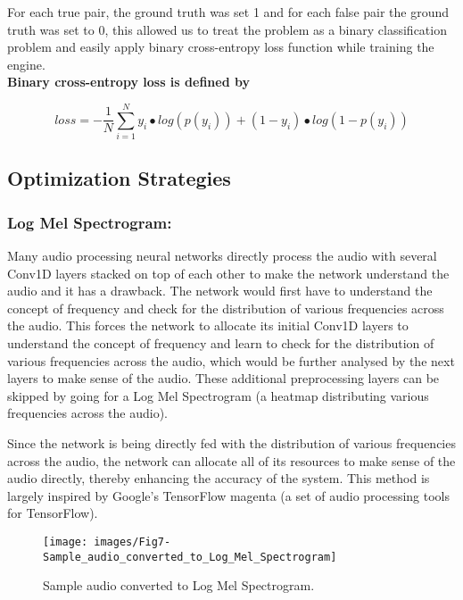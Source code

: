 \documentclass[10pt,twocolumn]{article}
\begin{document}
For each true pair, the ground truth was set 1 and for each false pair the ground truth was set to 0, this allowed us to treat the problem as a binary classification problem and easily apply binary cross-entropy loss function while training the engine.
\\


\textbf{Binary cross-entropy loss is defined by}

\[loss = - \frac{1}{N}\sum_{i = 1}^{N}y_{i} \bullet log\left( p\left( y_{i} \right) \right) + \left( 1 - y_{i} \right) \bullet log\left( 1 - p\left( y_{i} \right) \right)\]


\subsection{Optimization Strategies}

\subsubsection{Log Mel Spectrogram:~}

Many audio processing neural networks directly process the audio with several Conv1D layers stacked on top of each other to make the network understand the audio and it has a drawback. The network would first have to understand the concept of frequency and check for the distribution of various frequencies across the audio. This forces the network to allocate its initial Conv1D layers to understand the concept of frequency and learn to check for the distribution of various frequencies across the audio, which would be further analysed by the next layers to make sense of the audio. These additional preprocessing layers can be skipped by going for a Log Mel Spectrogram (a heatmap distributing various frequencies across the audio).

Since the network is being directly fed with the distribution of various frequencies across the audio, the network can allocate all of its resources to make sense of the audio directly, thereby enhancing the accuracy of the system. This method is largely inspired by Google's TensorFlow magenta (a set of audio processing tools for TensorFlow).

\begin{figure}
\centering
\texttt{[image: images/Fig7-Sample\_audio\_converted\_to\_Log\_Mel\_Spectrogram]}
\caption{Sample audio converted to Log Mel Spectrogram.}
\label{FIG:SampleaudioconvertedtoLogMelSpectrogram}
\end{figure}
\end{document}
